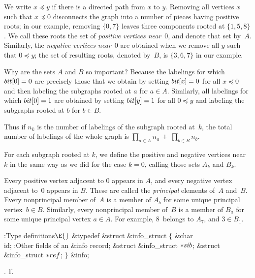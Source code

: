 We write $x\preceq y$ if there is a directed path from $x$ to $y$.
Removing all vertices $x$ such that $x\preceq 0$ disconnects the graph
into a number of pieces having positive roots; in our example, removing
$\{0,7\}$ leaves three components rooted at $\{1,5,8\}$. We call these roots
the set of {\it positive vertices near\/}~0, and denote that set by~$A$.
Similarly, the {\it negative vertices near\/}~0 are obtained when we remove
all $y$ such that $0\preceq y$; the set of resulting roots, denoted by~$B$, is
$\{3,6,7\}$ in our example.

Why are the sets $A$ and $B$ so important? Because
the labelings for which $\\{bit}[0]=0$ are
precisely those that we obtain by setting $\\{bit}[x]=0$ for all $x\preceq0$
and then labeling the subgraphs rooted at $a$ for $a\in A$.
Similarly, all labelings for which $\\{bit}[0]=1$ are obtained by
setting $\\{bit}[y]=1$ for all $0\preceq y$ and labeling the subgraphs
rooted at $b$ for $b\in B$.

Thus if $n_k$ is the number of labelings of the subgraph rooted at~$k$,
the total number of labelings of the whole graph is
$\prod_{a\in A}n_a\,+\,\prod_{b\in B}n_b$.

\smallskip
For each subgraph rooted at $k$, we define the positive and negative
vertices near~$k$ in the same way as we did for the case $k=0$,
calling those sets $A_k$ and $B_k$.

Every positive vertex adjacent to 0 appears in $A$, and every negative
vertex adjacent to~0 appears in $B$. These are called the {\it principal\/}
elements of~$A$ and~$B$. Every nonprincipal member of~$A$ is a member
of $A_b$ for some unique principal vertex~$b\in B$. Similarly, every
nonprincipal member of~$B$ is a member of $B_a$ for some unique
principal vertex $a\in A$. For example, 8~belongs to $A_7$, and
$3\in B_1$.

\Y\B\4:Type definitions\X${}\E{}$\6
\&{typedef} \&{struct} \&{info\_struct} ${}\{{}$\1\6
\&{char} \\{id};\7
:Other fields of an \&{info} record\X;\7
\&{struct} \&{info\_struct} ${}{*}\\{sib}{}$;\6
\&{struct} \&{info\_struct} ${}{*}\\{ref}{}$;\2\6
${}\}{}$ \&{info};\par
{}.
\U1.\fi

